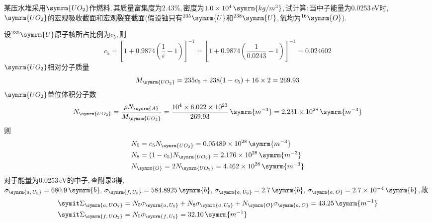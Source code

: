 \begin{exercise}
    某压水堆采用$\symrm{UO_2}$作燃料,\,其质量富集度为2.43\%,\,密度为$1.0\times 10^4\,\symrm{kg/m^3}$,\,试计算:\,当中子能量为0.0253\,eV时,\,$\symrm{UO_2}$的宏观吸收截面和宏观裂变截面(假设铀只有${}^{235}\symrm{U}$和${}^{238}\symrm{U}$,\,氧均为${}^{16}\symrm{O}$).\,
    \begin{solution}
        设${}^{235}\symrm{U}$原子核所占比例为$c_5$,\,则
        \begin{equation*}
            c_5 = \left[1+0.9874\left(\frac{1}{\varepsilon}-1\right)\right]^{-1} = \left[1+0.9874\left(\frac{1}{0.0243}-1\right)\right]^{-1} = 0.024602
        \end{equation*}
        $\symrm{UO_2}$相对分子质量
        \begin{equation*}
            M_{\symrm{UO_2}} = 235c_5 + 238(1-c_5) + 16\times 2 = 269.93
        \end{equation*}
        $\symrm{UO_2}$单位体积分子数
        \begin{equation*}
            N_{\symrm{UO_2}} = \frac{\rho N_{\symrm{A}}}{M_{\symrm{UO_2}}} = \frac{10^4 \times 6.022 \times 10^{23}}{269.93} \, \symrm{m^{-3}} = 2.231 \times 10^{28}\,\symrm{m^{-3}}
        \end{equation*}
        则
        \begin{align*}
            &N_5 = c_5 N_{\symrm{UO_2}} = 0.05489 \times 10^{28}\,\symrm{m^{-3}} \\
            &N_8 = (1-c_5) N_{\symrm{UO_2}} = 2.176 \times 10^{28}\,\symrm{m^{-3}} \\
            &N_{\symrm{O}} = 2 N_{\symrm{UO_2}} = 4.462 \times 10^{28}\,\symrm{m^{-3}}
        \end{align*}
        对于能量为0.0253\,eV的中子,\,查附录3得,\,$\sigma_{\symrm{a,\,U_5}} = 680.9\,\symrm{b},\,\sigma_{\symrm{f,\,U_5}} = 584.8925\,\symrm{b},\,\sigma_{\symrm{a,\,U_8}} = 2.7\,\symrm{b},\,\sigma_{\symrm{a,\,O}} = 2.7 \times 10^{-4}\,\symrm{b}$,\,故
        \begin{align*}
            &\vSigma_{\symrm{a,\,UO_2}} = N_5\sigma_{\symrm{a,\,U_5}} + N_8\sigma_{\symrm{a,\,U_8}} + N_{\symrm{O}}\sigma_{\symrm{a,\,O}} = 43.25\,\symrm{m^{-1}} \\
            &\vSigma_{\symrm{f,\,UO_2}} = N_5\sigma_{\symrm{f,\,U_5}} = 32.10\,\symrm{m^{-1}}
        \end{align*}
    \end{solution}
\end{exercise}

